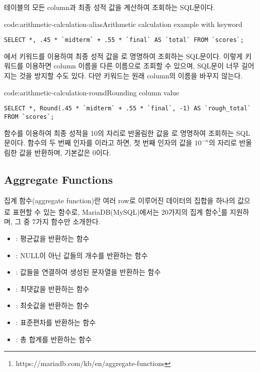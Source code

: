 \은  테이블의 모든 column과 최종 성적 값을 계산하여 조회하는 SQL문이다.

\begin{code}{code:arithmetic-calculation-alias}{Arithmetic calculation example with  keyword}
\begin{verbatim}
SELECT *, .45 * `midterm` + .55 * `final` AS `total` FROM `scores`;
\end{verbatim}
\end{code}

\은 에서  키워드를 이용하여 최종 성적 값을 로 명명하여 조회하는 SQL문이다. 이렇게  키워드를 이용하면 column 이름을 다른 이름으로 조회할 수 있으며, SQL문이 너무 길어지는 것을 방지할 수도 있다. 다만  키워드는 원래 column의 이름을 바꾸지 않는다.

\begin{code}{code:arithmetic-calculation-round}{Rounding column value}
\begin{verbatim}
SELECT *, Round(.45 * `midterm` + .55 * `final`, -1) AS `rough_total` FROM `scores`;
\end{verbatim}
\end{code}

\는  함수를 이용하여 최종 성적을 10의 자리로 반올림한 값을 로 명명하여 조회하는 SQL문이다.  함수의 두 번째 인자를 이라고 하면, 첫 번째 인자의 값을 $10^{-n}$의 자리로 반올림한 값을 반환하며, 기본값은 0이다.

\subsection*{Aggregate Functions}

집계 함수(aggregate function)란 여러 row로 이루어진 데이터의 집합을 하나의 값으로 표현할 수 있는 함수로, MariaDB(MySQL)에서는 20가지의 집계 함수\footnote{https://mariadb.com/kb/en/aggregate-functions}를 지원하며, 그 중 7가지 함수만 소개한다.

\begin{itemize}
    \item {}: 평균값을 반환하는 함수
    \item {}: NULL이 아닌 값들의 개수를 반환하는 함수
    \item {}: 값들을 연결하여 생성된 문자열을 반환하는 함수
    \item {}: 최댓값을 반환하는 함수
    \item {}: 최솟값을 반환하는 함수
    \item {}: 표준편차를 반환하는 함수
    \item {}: 총 합계를 반환하는 함수
\end{itemize}

